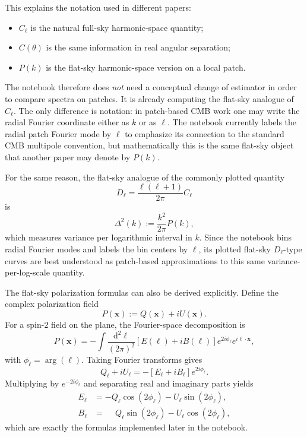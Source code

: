 \documentclass[11pt]{article}
\newcommand{\dd}{\mathrm{d}}
\begin{document}
This explains the notation used in different papers:
\begin{itemize}[leftmargin=1.5em]
  \item \(C_\ell\) is the natural full-sky harmonic-space quantity;
  \item \(C(\theta)\) is the same information in real angular separation;
  \item \(P(k)\) is the flat-sky harmonic-space version on a local patch.
\end{itemize}

The notebook therefore does \emph{not} need a conceptual change of estimator in order to compare spectra on patches. It is already computing the flat-sky analogue of \(C_\ell\). The only difference is notation: in patch-based CMB work one may write the radial Fourier coordinate either as \(k\) or as \(\ell\). The notebook currently labels the radial patch Fourier mode by \(\ell\) to emphasize its connection to the standard CMB multipole convention, but mathematically this is the same flat-sky object that another paper may denote by \(P(k)\).

For the same reason, the flat-sky analogue of the commonly plotted quantity
\begin{equation}
  D_\ell = \frac{\ell(\ell+1)}{2\pi}C_\ell
\end{equation}
is
\begin{equation}
  \Delta^2(k)
  :=
  \frac{k^2}{2\pi}P(k),
\end{equation}
which measures variance per logarithmic interval in \(k\). Since the notebook bins radial Fourier modes and labels the bin centers by \(\ell\), its plotted flat-sky \(D_\ell\)-type curves are best understood as patch-based approximations to this same variance-per-log-scale quantity.

The flat-sky polarization formulas can also be derived explicitly. Define the complex polarization field
\begin{equation}
  P(\bm{x}) := Q(\bm{x}) + iU(\bm{x}).
\end{equation}
For a spin-\(2\) field on the plane, the Fourier-space decomposition is
\begin{equation}
  P(\bm{x})
  =
  -\int \frac{\dd^2\bm{\ell}}{(2\pi)^2}
  \left[E(\bm{\ell}) + iB(\bm{\ell})\right]
  e^{2i\phi_{\bm{\ell}}}
  e^{i\bm{\ell}\cdot\bm{x}},
\end{equation}
with \(\phi_{\bm{\ell}}=\arg(\bm{\ell})\). Taking Fourier transforms gives
\begin{equation}
  Q_{\bm{\ell}} + iU_{\bm{\ell}}
  =
  -\left[E_{\bm{\ell}} + iB_{\bm{\ell}}\right]e^{2i\phi_{\bm{\ell}}}.
\end{equation}
Multiplying by \(e^{-2i\phi_{\bm{\ell}}}\) and separating real and imaginary parts yields
\begin{align}
  E_{\bm{\ell}} &= -Q_{\bm{\ell}}\cos(2\phi_{\bm{\ell}}) - U_{\bm{\ell}}\sin(2\phi_{\bm{\ell}}),\\
  B_{\bm{\ell}} &= \phantom{-}Q_{\bm{\ell}}\sin(2\phi_{\bm{\ell}}) - U_{\bm{\ell}}\cos(2\phi_{\bm{\ell}}),
\end{align}
which are exactly the formulas implemented later in the notebook.
\end{document}
